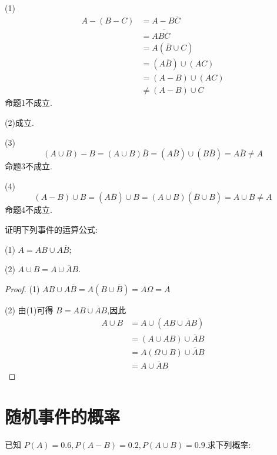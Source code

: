 \begin{solution}
    (1)
    $$
    \begin{aligned}
        A-(B-C) &= A - B \overline{C} \\
        &= A \overline{B \overline{C}} \\
        &= A (\overline{B} \cup C) \\
        &= (A \overline{B}) \cup (AC) \\
        &= (A-B) \cup (AC) \\
        & \not= (A-B) \cup C
    \end{aligned}
    $$
    命题1不成立.

    (2)成立.

    (3)
    $$
    (A \cup B) - B = (A \cup B) \overline{B} = (A \overline{B}) \cup (B \overline{B}) = A \overline{B} \not= A
    $$
    命题3不成立.

    (4)
    $$
    (A - B) \cup B = (A \overline{B}) \cup B = (A \cup B)(\overline{B} \cup B) = A \cup B \not= A
    $$
    命题4不成立.
\end{solution}

\vspace{1em}

\question 证明下列事件的运算公式:

(1) $A = AB \cup A \overline{B}$;

(2) $A \cup B = A \cup \overline{A} B$.

\begin{proof}
    (1) $AB \cup A \overline{B} = A(B \cup \overline{B}) = A \varOmega = A$

    (2) 由(1)可得 $B = AB \cup \overline{A} B$,因此
    $$
    \begin{aligned}
        A \cup B &= A \cup (AB \cup \overline{A} B) \\
        &= (A \cup AB) \cup \overline{A} B \\
        &= A(\varOmega \cup B) \cup \overline{A} B \\
        &= A \cup \overline{A} B
    \end{aligned}
    $$
\end{proof}

\section{随机事件的概率}


\question 已知 $P(A)=0.6, P(A-B)=0.2, P(A \cup B) = 0.9$.求下列概率:

